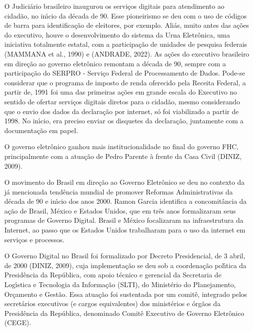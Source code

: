 \documentclass[
12pt,		%
openright,	%
twoside,  %
a4paper,			%
chapter=TITLE,		%
english,			%
french,				%
spanish,			%
brazil				%
]{USPSC-classe/USPSC}
\begin{document}
O Judici\'ario brasileiro inaugurou os servi\c{c}os digitais para atendimento ao cidad\~ao, no in\'{\i}cio da d\'ecada de 90. Esse pioneirismo se deu com o uso de c\'odigos de barra para identifica\c{c}\~ao de eleitores, por exemplo. Ali\'as, muito antes das a\c{c}\~oes do executivo, houve o desenvolvimento do sistema da Urna Eletr\^onica, uma iniciativa totalmente estatal, com a participa\c{c}\~ao de unidades de pesquisa federais  (MAMMANA et al., 1990) e (ANDRADE, 2022). As a\c{c}\~oes do executivo brasileiro em dire\c{c}\~ao ao governo eletr\^onico remontam a d\'ecada de 90, sempre com a participa\c{c}\~ao do SERPRO - Servi\c{c}o Federal de Processamento de Dados. Pode-se considerar que o programa de imposto de renda oferecido pela Receita Federal, a partir de, 1991 foi uma das primeiras a\c{c}\~oes em grande escala do Executivo no sentido de ofertar servi\c{c}os digitais diretos para o cidad\~ao, mesmo considerando que o envio dos dados da declara\c{c}\~ao por internet, s\'o foi viabilizado a partir de 1998. No in\'{\i}cio, era preciso enviar os disquetes da declara\c{c}\~ao, juntamente com a documenta\c{c}\~ao em papel.








O governo eletr\^onico ganhou mais institucionalidade no final do governo FHC, principalmente com a atua\c{c}\~ao de Pedro Parente \`a frente da Casa Civil  (DINIZ, 2009).








O movimento do Brasil em dire\c{c}\~ao ao Governo Eletr\^onico se deu no contexto da j\'a mencionada tend\^encia mundial de promover Reformas Administrativas da d\'ecada de 90 e in\'{\i}cio dos anos 2000. Ramon Garcia identifica a concomit\^ancia da a\c{c}\~ao de Brasil, M\'exico e Estados Unidos, que em tr\^es anos formalizaram seus programas de Governo Digital. Brasil e M\'exico focalizaram na infraestrutura da Internet, ao passo que os Estados Unidos trabalharam para o uso da internet em servi\c{c}os e processos.








O Governo Digital no Brasil foi formalizado por Decreto Presidencial, de 3 abril, de 2000  (DINIZ, 2009), cuja implementa\c{c}\~ao se deu sob a coordena\c{c}\~ao pol\'{\i}tica da Presid\^encia da Rep\'ublica, com apoio t\'ecnico e gerencial da Secretaria de Log\'{\i}stica e Tecnologia da Informa\c{c}\~ao (SLTI), do Minist\'erio do Planejamento, Or\c{c}amento e Gest\~ao. Essa atua\c{c}\~ao foi sustentada por um comit\^e, integrado pelos secret\'arios executivos (e cargos equivalentes) dos minist\'erios e \'org\~aos da Presid\^encia da Rep\'ublica, denominado Comit\^e Executivo de Governo Eletr\^onico (CEGE).
\end{document}
